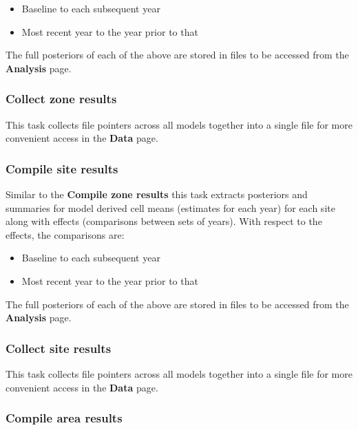 \documentclass[
  8pt,
  a4paper]{article}
\providecommand{\tightlist}{%
  \setlength{\itemsep}{0pt}\setlength{\parskip}{0pt}}\usepackage{longtable,booktabs,array}
\begin{document}
\begin{itemize}
\tightlist
\item
  Baseline to each subsequent year
\item
  Most recent year to the year prior to that
\end{itemize}

The full posteriors of each of the above are stored in files to be
accessed from the \textbf{Analysis} page.

\subsubsection{Collect zone results}\label{collect-zone-results}

This task collects file pointers across all models together into a
single file for more convenient access in the \textbf{Data} page.

\subsubsection{Compile site results}\label{compile-site-results}

Similar to the \textbf{Compile zone results} this task extracts
posteriors and summaries for model derived cell means (estimates for
each year) for each site along with effects (comparisons between sets of
years). With respect to the effects, the comparisons are:

\begin{itemize}
\tightlist
\item
  Baseline to each subsequent year
\item
  Most recent year to the year prior to that
\end{itemize}

The full posteriors of each of the above are stored in files to be
accessed from the \textbf{Analysis} page.

\subsubsection{Collect site results}\label{collect-site-results}

This task collects file pointers across all models together into a
single file for more convenient access in the \textbf{Data} page.

\subsubsection{Compile area results}\label{compile-area-results}
\end{document}
